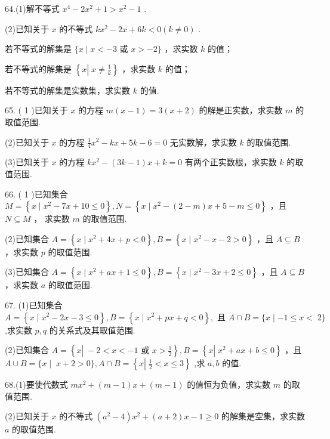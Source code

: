 \documentclass[10pt]{article}
\newcommand*\circled[1]{\tikz[baseline=(char.base)]{\node[shape=circle,draw,inner sep=1.5pt] (char) {\small #1};}}
\begin{document}
64.(1)解不等式 \({x}^{4} - 2{x}^{2} + 1 > {x}^{2} - 1\) .

(2)已知关于 \(x\) 的不等式 \(k{x}^{2} - {2x} + {6k} < 0\left( {k \neq  0}\right)\) .

 \circled{1} 若不等式的解集是 \(\{ x \mid  x <  - 3\) 或 \(x >  - 2\}\) ，求实数 \(k\) 的值；

 \circled{2} 若不等式的解集是 \(\left\{  {x\left| {\;x \neq  \frac{1}{k}}\right. }\right\}\) ，求实数 \(k\) 的值；

 \circled{3} 若不等式的解集是实数集，求实数 \(k\) 的值.

65. ( 1 )已知关于 \(x\) 的方程 \(m\left( {x - 1}\right)  = 3\left( {x + 2}\right)\) 的解是正实数，求实数 \(m\) 的取值范围.

(2)已知关于 \(x\) 的方程 \(\frac{1}{4}{x}^{2} - {kx} + {5k} - 6 = 0\) 无实数解，求实数 \(k\) 的取值范围.

(3)已知关于 \(x\) 的方程 \(k{x}^{2} - \left( {{3k} - 1}\right) x + k = 0\) 有两个正实数根，求实数 \(k\) 的取值范围.

66. ( 1 )已知集合 \(M = \left\{  {x \mid  {x}^{2} - {7x} + {10} \leq  0}\right\}  ,N = \left\{  {x \mid  {x}^{2} - \left( {2 - m}\right) x + 5 - m \leq  0}\right\}\) ，且 \(N \subseteq  M\) ， 求实数 \(m\) 的取值范围.

(2)已知集合 \(A = \left\{  {x \mid  {x}^{2} + {4x} + p < 0}\right\}  ,B = \left\{  {x \mid  {x}^{2} - x - 2 > 0}\right\}\) ，且 \(A \subseteq  B\) ，求实数 \(p\) 的取值范围.

(3)已知集合 \(A = \left\{  {x \mid  {x}^{2} + {ax} + 1 \leq  0}\right\}  ,B = \left\{  {x \mid  {x}^{2} - {3x} + 2 \leq  0}\right\}\) ，且 \(A \subseteq  B\) ，求实数 \(a\) 的取值范围.

67. (1)已知集合 \(A = \left\{  {x \mid  {x}^{2} - {2x} - 3 \leq  0}\right\}  ,B = \left\{  {x \mid  {x}^{2} + {px} + q < 0}\right\}  ,{\text{ 且 }A \cap  B = \{ x \mid   - 1 \leq  x < } \; 2\}\) ,求实数 \(p,q\) 的关系式及其取值范围.

(2)已知集合 \(A = \left\{  {x\left| {\; - 2 < x <  - 1\text{ 或 }x > \frac{1}{2}}\right. }\right\}  ,B = \left\{  {x\left| {\;{x}^{2} + {ax} + b \leq  0}\right. }\right\}\) ，且 \(A \cup  B = \{ x \mid \; x + 2 > 0\} ,A \cap  B = \left\{  {x\left| {\;\frac{1}{2} < x \leq  3}\right. }\right\}\) ,求 \(a,b\) 的值.

68.(1)要使代数式 \(m{x}^{2} + \left( {m - 1}\right) x + \left( {m - 1}\right)\) 的值恒为负值，求实数 \(m\) 的取值范围.

(2)已知关于 \(x\) 的不等式 \(\left( {{a}^{2} - 4}\right) {x}^{2} + \left( {a + 2}\right) x - 1 \geq  0\) 的解集是空集，求实数 \(a\) 的取值范围.
\end{document}
